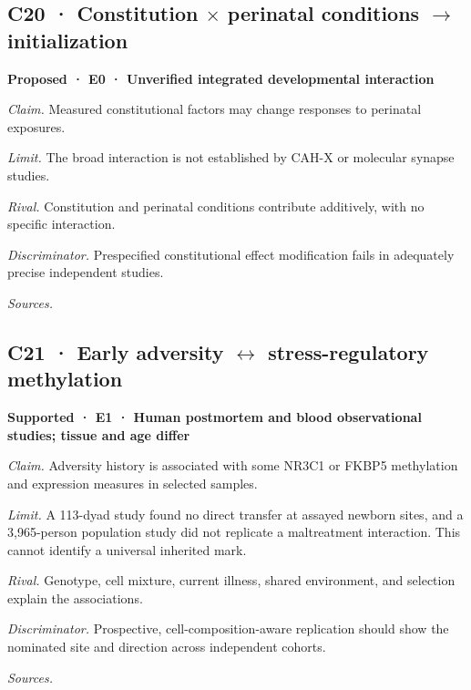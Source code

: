 \subsection*{C20 · Constitution \ensuremath{\times} perinatal conditions \ensuremath{\rightarrow} initialization}
\noindent\textbf{Proposed · E0 · Unverified integrated developmental interaction}\par
\textit{Claim.} Measured constitutional factors may change responses to perinatal exposures.\par
\textit{Limit.} The broad interaction is not established by CAH-X or molecular synapse studies.\par
\textit{Rival.} Constitution and perinatal conditions contribute additively, with no specific interaction.\par
\textit{Discriminator.} Prespecified constitutional effect modification fails in adequately precise independent studies.\par
\textit{Sources.} \cite{projP1,projP3,ref13}\par
\subsection*{C21 · Early adversity \ensuremath{\leftrightarrow} stress-regulatory methylation}
\noindent\textbf{Supported · E1 · Human postmortem and blood observational studies; tissue and age differ}\par
\textit{Claim.} Adversity history is associated with some NR3C1 or FKBP5 methylation and expression measures in selected samples.\par
\textit{Limit.} A 113-dyad study found no direct transfer at assayed newborn sites, and a 3,965-person population study did not replicate a maltreatment interaction. This cannot identify a universal inherited mark.\par
\textit{Rival.} Genotype, cell mixture, current illness, shared environment, and selection explain the associations.\par
\textit{Discriminator.} Prospective, cell-composition-aware replication should show the nominated site and direction across independent cohorts.\par
\textit{Sources.} \cite{ref15,ref25,ref26,ref34}\par

